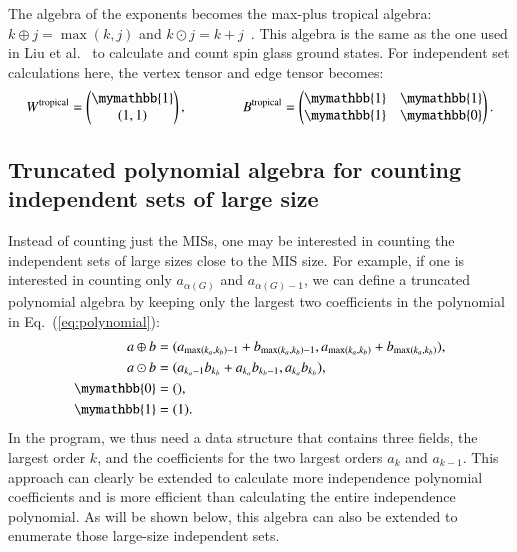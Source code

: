 \documentclass[onefignum, onetabnum]{siamart190516}
\newcommand{\<}{\langle}
\renewcommand{\>}{\rangle}
\newcommand{\Eq}[1]{Eq.~(\ref{#1})}
\newcounter{example}
\begin{document}
The algebra of the exponents becomes the max-plus tropical algebra: $k \oplus j = \max(k,j)$ and $k \odot j = k + j$~\cite{Maclagan2015, Moore2011}.
This algebra is the same as the one used in Liu et al.~\cite{Liu2021} to calculate and count spin glass ground states.
For independent set calculations here, the vertex tensor and edge tensor becomes:
\begin{equation}
    W^{\rm tropical} = \left(\begin{matrix}
        \mymathbb{1} \\
        (1,1)
    \end{matrix}\right),   
    \qquad \qquad
        B^{\rm tropical} = \left(\begin{matrix}
        \mymathbb{1}  & \mymathbb{1} \\
        \mymathbb{1} & \mymathbb{0}
    \end{matrix}\right).
\end{equation}

\subsection{Truncated polynomial algebra for counting independent sets of large size}
Instead of counting just the MISs, one may be interested in counting the independent sets of large sizes close to the MIS size.
For example, if one is interested in counting only $a_{\alpha(G)}$ and $a_{\alpha(G)-1}$, we can define a truncated polynomial algebra by keeping only the largest two coefficients in the polynomial in \Eq{eq:polynomial}:
\begin{equation}
    \begin{split}
    a \oplus b &= (a_{\max(k_a, k_b)-1} + b_{\max(k_a, k_b)-1}, a_{\max(k_a, k_b)} + b_{\max(k_a, k_b)}),\\
    a \odot b &= (a_{k_a-1} b_{k_b}+a_{k_a} b_{k_b-1}, a_{k_a} b_{k_b}),\\
    \mymathbb{0} &= (), \\
    \mymathbb{1} &= (1).\label{eq:max2poly}
    \end{split}
\end{equation}
In the program, we thus need a data structure that contains three fields, the largest order $k$, and the coefficients for the two largest orders $a_k$ and $a_{k-1}$.
This approach can clearly be extended to calculate more independence polynomial coefficients and is more efficient than calculating the entire independence polynomial.
As will be shown below, this algebra can also be extended to enumerate those large-size independent sets.
\end{document}

